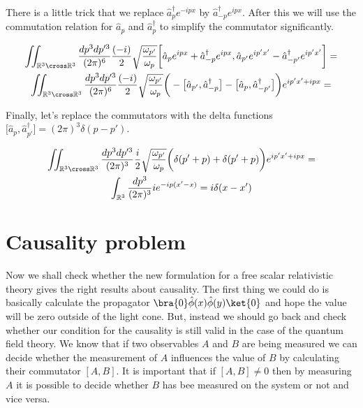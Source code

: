 There is a little trick that we replace $\hat{a}^{\dagger}_{p} e^{- i p x}$ by $\hat{a}^{\dagger}_{-p} e^{i p x}$. After this we will
use the commutation relation for $\hat{a}_{p}$ and $\hat{a}^{\dagger}_{p}$ to simplify the commutator significantly.

\begin{equation*}
    \begin{gathered}
        \iint_{\mathbb{R}^{3} \cross \mathbb{R}^{3}} \frac{dp^{3} dp'^{3}}{(2 \pi)^{6}} \frac{(-i)}{2} \sqrt{\frac{\omega_{p'}}{\omega_{p}}}
        \bigg[
            \hat{a}_{p} e^{i p x} + \hat{a}^{\dagger}_{-p} e^{i p x},
            \hat{a}_{p'} e^{i p' x'} - \hat{a}^{\dagger}_{-p'} e^{i p' x'}
        \bigg] = \\
        \iint_{\mathbb{R}^{3} \cross \mathbb{R}^{3}} \frac{dp^{3} dp'^{3}}{(2 \pi)^{6}} \frac{(-i)}{2} \sqrt{\frac{\omega_{p'}}{\omega_{p}}}
        \bigg(
           - \big[ \hat{a}_{p'}, \hat{a}^{\dagger}_{-p} \big]
           - \big[ \hat{a}_{p}, \hat{a}^{\dagger}_{-p'} \big] 
        \bigg) e^{i p' x' + i p x}=
    \end{gathered}
\end{equation*}

Finally, let's replace the commutators with the delta functions $\big[\hat{a}_{p}, \hat{a}^{\dagger}_{p'} \big] = (2 \pi)^{3} \delta(p - p')$.

\begin{equation*}
    \begin{gathered}
        \iint_{\mathbb{R}^{3} \cross \mathbb{R}^{3}} \frac{dp^{3} dp'^{3}}{(2 \pi)^{3}} \frac{i}{2} \sqrt{\frac{\omega_{p'}}{\omega_{p}}}
        \bigg( \delta(p' + p) + \delta(p' + p) \bigg) e^{i p' x' + i p x} = \\
        \int_{\mathbb{R}^{3}} \frac{dp^{3}}{(2 \pi)^{3}} i e^{- i p(x' - x)} = i \delta(x - x') \\
    \end{gathered}
\end{equation*}

\section{Causality problem}

Now we shall check whether the new formulation for a free scalar relativistic theory gives the right results about causality.
The first thing we could do is basically calculate the propagator $\bra{0} \hat{\phi}(x) \hat{\phi}(y) \ket{0}$ and hope the 
value will be zero outside of the light cone. But, instead we should go back and check whether our condition for the causality
is still valid in the case of the quantum field theory. We know that if two observables $A$ and $B$ are being measured we can
decide whether the measurement of $A$ influences the value of $B$ by calculating their commutator $[A, B]$. It is important that
if $[A, B] \neq 0$ then by measuring $A$ it is possible to decide whether $B$ has bee measured on the system or not and vice 
versa.

